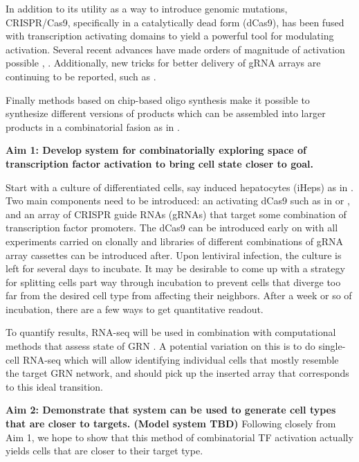 \documentclass[10pt]{article}
\begin{document}
In addition to its utility as a way to introduce genomic mutations, CRISPR/Cas9, specifically in a catalytically dead form (dCas9), has been fused with transcription activating domains to yield a powerful tool for modulating activation. Several recent advances have made orders of magnitude of activation possible \cite{chavez2015VPR}, \cite{konermann2014genome}. Additionally, new tricks for better delivery of gRNA arrays are continuing to be reported, such as \cite{xie2015boosting}.

Finally methods based on chip-based oligo synthesis make it possible to synthesize different versions of products which can be assembled into larger products in a combinatorial fasion as in \cite{kosuri2010scalable}.
\newline

\textbf{Aim 1: Develop system for combinatorially exploring space of transcription factor activation to bring cell state closer to goal.}

Start with a culture of differentiated cells, say induced hepatocytes (iHeps) as in \cite{morris2014dissecting}. Two main components need to be introduced: an activating dCas9 such as in \cite{chavez2015VPR} or \cite{konermann2014genome}, and an array of CRISPR guide RNAs (gRNAs) that target some combination of transcription factor promoters. The dCas9 can be introduced early on with all experiments carried on clonally and libraries of different combinations of gRNA array cassettes can be introduced after. Upon lentiviral infection, the culture is left for several days to incubate. It may be desirable to come up with a strategy for splitting cells part way through incubation to prevent cells that diverge too far from the desired cell type from affecting their neighbors. After a week or so of incubation, there are a few ways to get quantitative readout.

To quantify results, RNA-seq will be used in combination with computational methods that assess state of GRN \cite{cahan2014cellnet}. A potential variation on this is to do single-cell RNA-seq which will allow identifying individual cells that mostly resemble the target GRN network, and should pick up the inserted array that corresponds to this ideal transition.
\newline

\textbf{Aim 2: Demonstrate that system can be used to generate cell types that are closer to targets. (Model system TBD)} Following closely from Aim 1, we hope to show that this method of combinatorial TF activation actually yields cells that are closer to their target type.
\newline
\end{document}
